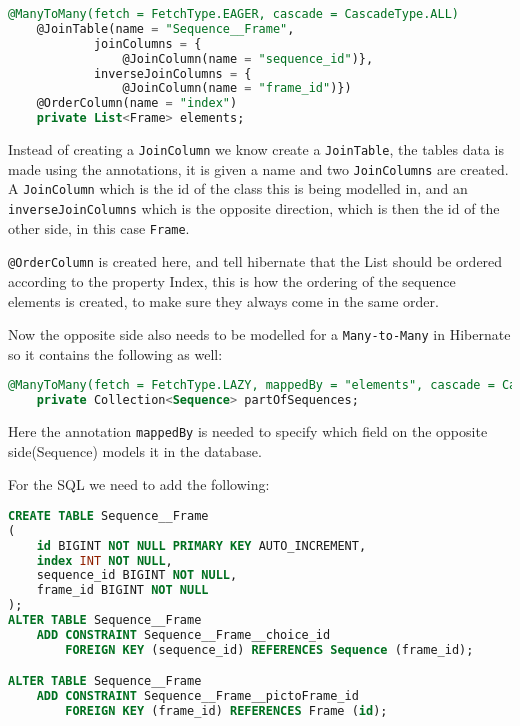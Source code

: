 \begin{lstlisting}[caption={The Annotations required for a \texttt{Many-to-Many} relationship without creating an extra class to model it.}, language=sql]
    @ManyToMany(fetch = FetchType.EAGER, cascade = CascadeType.ALL)
    @JoinTable(name = "Sequence__Frame",
            joinColumns = {
                @JoinColumn(name = "sequence_id")},
            inverseJoinColumns = {
                @JoinColumn(name = "frame_id")})
    @OrderColumn(name = "index")
    private List<Frame> elements;
\end{lstlisting}

Instead of creating a \texttt{JoinColumn} we know create a \texttt{JoinTable}, the tables data is made using the annotations, it is given a name and two \texttt{JoinColumns} are created.
A \texttt{JoinColumn} which is the id of the class this is being modelled in, and an \texttt{inverseJoinColumns} which is the opposite direction, which is then the id of the other side, in this case \texttt{Frame}.

\texttt{@OrderColumn} is created here, and tell hibernate that the List should be ordered according to the property Index, this is how the ordering of the sequence elements is created, to make sure they always come in the same order.

Now the opposite side also needs to be modelled for a \texttt{Many-to-Many} in Hibernate so it contains the following as well:

\begin{lstlisting}[caption={The opposite side of the relations needs to say it is mappedBy the other end.}, language=sql]
 @ManyToMany(fetch = FetchType.LAZY, mappedBy = "elements", cascade = CascadeType.ALL)
    private Collection<Sequence> partOfSequences;
\end{lstlisting}

Here the annotation \texttt{mappedBy} is needed to specify which field on the opposite side(Sequence) models it in the database.

For the SQL we need to add the following:


\begin{lstlisting}[caption={The SQL for the above mentioned \texttt{Many-to-Many} relationship.}, language=sql]
CREATE TABLE Sequence__Frame
(
    id BIGINT NOT NULL PRIMARY KEY AUTO_INCREMENT,
    index INT NOT NULL,
    sequence_id BIGINT NOT NULL,
    frame_id BIGINT NOT NULL
);
ALTER TABLE Sequence__Frame
    ADD CONSTRAINT Sequence__Frame__choice_id
        FOREIGN KEY (sequence_id) REFERENCES Sequence (frame_id);

ALTER TABLE Sequence__Frame
    ADD CONSTRAINT Sequence__Frame__pictoFrame_id
        FOREIGN KEY (frame_id) REFERENCES Frame (id);
\end{lstlisting}


